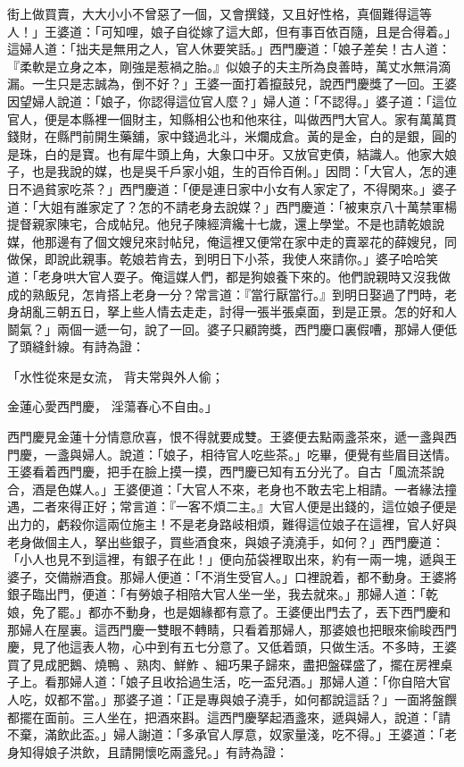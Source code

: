 街上做買賣，大大小小不曾惡了一個，又會撰錢，又且好性格，真個難得這等人！」王婆道：「可知哩，娘子自從嫁了這大郎，但有事百依百隨，且是合得着。」這婦人道：「拙夫是無用之人，官人休要笑話。」西門慶道：「娘子差矣！古人道：『柔軟是立身之本，剛強是惹禍之胎。』似娘子的夫主所為良善時，萬丈水無涓滴漏。一生只是志誠為，倒不好？」王婆一面打着攛鼓兒，說西門慶獎了一回。王婆因望婦人說道：「娘子，你認得這位官人麼？」婦人道：「不認得。」婆子道：「這位官人，便是本縣裡一個財主，知縣相公也和他來往，叫做西門大官人。家有萬萬貫錢財，在縣門前開生藥舖，家中錢過北斗，米爛成倉。黃的是金，白的是銀，圓的是珠，白的是寶。也有犀牛頭上角，大象口中牙。又放官吏債，結識人。他家大娘子，也是我說的媒，也是吳千戶家小姐，生的百伶百俐。」因問：「大官人，怎的連日不過貧家吃茶？」西門慶道：「便是連日家中小女有人家定了，不得閑來。」婆子道：「大姐有誰家定了？怎的不請老身去說媒？」西門慶道：「被東京八十萬禁軍楊提督親家陳宅，合成帖兒。他兒子陳經濟纔十七歲，還上學堂。不是也請乾娘說媒，他那邊有了個文嫂兒來討帖兒，俺這裡又便常在家中走的賣翠花的薛嫂兒，同做保，即說此親事。乾娘若肯去，到明日下小茶，我使人來請你。」婆子哈哈笑道：「老身哄大官人耍子。俺這媒人們，都是狗娘養下來的。他們說親時又沒我做成的熟飯兒，怎肯搭上老身一分？常言道：『當行厭當行。』到明日娶過了門時，老身胡亂三朝五日，拏上些人情去走走，討得一張半張桌面，到是正景。怎的好和人鬬氣？」兩個一遞一句，說了一回。婆子只顧誇獎，西門慶口裏假嘈，那婦人便低了頭縫針線。有詩為證：

「水性從來是女流，  背夫常與外人偷；

金蓮心愛西門慶，  淫蕩春心不自由。」

西門慶見金蓮十分情意欣喜，恨不得就要成雙。王婆便去點兩盞茶來，遞一盞與西門慶，一盞與婦人。說道：「娘子，相待官人吃些茶。」吃畢，便覺有些眉目送情。王婆看着西門慶，把手在臉上摸一摸，西門慶已知有五分光了。自古「風流茶說合，酒是色媒人。」王婆便道：「大官人不來，老身也不敢去宅上相請。一者緣法撞遇，二者來得正好；常言道：『一客不煩二主。』大官人便是出錢的，這位娘子便是出力的，虧殺你這兩位施主！不是老身路岐相煩，難得這位娘子在這裡，官人好與老身做個主人，拏出些銀子，買些酒食來，與娘子澆澆手，如何？」西門慶道：「小人也見不到這裡，有銀子在此！」便向茄袋裡取出來，約有一兩一塊，遞與王婆子，交備辦酒食。那婦人便道：「不消生受官人。」口裡說着，都不動身。王婆將銀子臨出門，便道：「有勞娘子相陪大官人坐一坐，我去就來。」那婦人道：「乾娘，免了罷。」都亦不動身，也是姻緣都有意了。王婆便出門去了，丟下西門慶和那婦人在屋裏。這西門慶一雙眼不轉睛，只看着那婦人，那婆娘也把眼來偷睃西門慶，見了他這表人物，心中到有五七分意了。又低着頭，只做生活。不多時，王婆買了見成肥鵝、燒鴨 、熟肉、鮮鮓 、細巧果子歸來，盡把盤碟盛了，擺在房裡桌子上。看那婦人道：「娘子且收拾過生活，吃一盃兒酒。」那婦人道：「你自陪大官人吃，奴都不當。」那婆子道：「正是專與娘子澆手，如何都說這話？」一面將盤饌都擺在面前。三人坐在，把酒來斟。這西門慶拏起酒盞來，遞與婦人，說道：「請不棄，滿飲此盃。」婦人謝道：「多承官人厚意，奴家量淺，吃不得。」王婆道：「老身知得娘子洪飲，且請開懷吃兩盞兒。」有詩為證：

